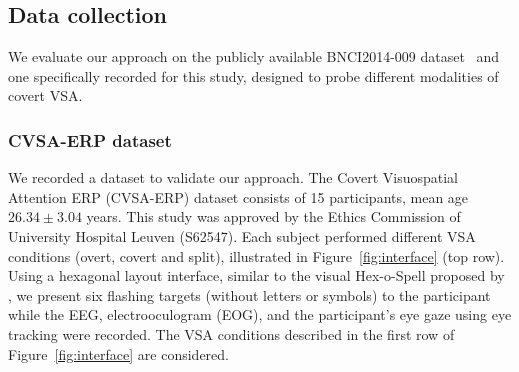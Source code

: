 \subsection{Data collection}
We evaluate our approach on the
publicly available BNCI2014-009 dataset~\cite{Aloise2012a} and one specifically recorded for this study, designed to
probe different modalities of covert VSA.

\subsubsection{CVSA-ERP dataset}
\label{sec:covert-align/stimulation}

We recorded a dataset to validate our approach.
The Covert Visuospatial Attention ERP (CVSA-ERP) dataset
consists of 15 participants, mean age $26.34\pm3.04$ years.
This study was approved by the Ethics Commission of University Hospital Leuven
(S62547).
Each subject performed different VSA conditions (overt, covert and split),
illustrated in Figure~\ref{fig:interface} (top row).
Using a hexagonal layout interface, similar to the visual Hex-o-Spell proposed
by \cite{Treder2010}, we present six flashing targets (without letters or
symbols) to the participant while the EEG, electrooculogram (EOG), and the
participant's eye gaze using eye tracking were recorded.
The VSA conditions described in the first row of Figure~\ref{fig:interface} are
considered.
